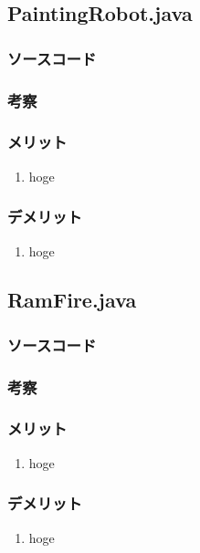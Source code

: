 \documentclass[12pt]{jarticle} %
\begin{document}
\begin{flushleft}
\subsection{PaintingRobot.java}
\subsubsection{ソースコード}

\subsubsection{考察}
\subsubsection{メリット}
\begin{enumerate}
\item hoge
\end{enumerate}
\subsubsection{デメリット}
\begin{enumerate}
\item hoge
\end{enumerate}

\subsection{RamFire.java}
\subsubsection{ソースコード}

\subsubsection{考察}
\subsubsection{メリット}
\begin{enumerate}
\item hoge
\end{enumerate}
\subsubsection{デメリット}
\begin{enumerate}
\item hoge
\end{enumerate}


\end{flushleft}
\end{document}
